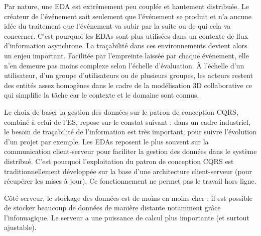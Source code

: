 Par nature, une \gls{EDA} est extrêmement peu couplée et 
hautement distribuée. Le créateur de l'événement sait seulement que l'événement 
se produit et n'a aucune idée du traitement que l'événement va subir par 
la suite ou de qui cela va concerner. 
C'est pourquoi les \glspl{EDA} sont plus utilisées dans un 
contexte de flux d'information asynchrone. La traçabilité dans ces environnements 
devient alors un enjeu important. Facilitée par l'empreinte laissée par chaque 
événement, elle n'en demeure pas moins complexe selon l'échelle d'évaluation. À 
l'échelle d'un utilisateur, d'un groupe d'utilisateurs ou de plusieurs groupes, les
acteurs restent des entités assez homogènes dans le cadre de la modélisation 
\gls{3D} collaborative ce qui simplifie la tâche car le contexte et le domaine sont
connus.



%

Le choix de baser la gestion des données sur le patron de conception \gls{CQRS}, 
combiné à celui de l'\gls{ES}, repose sur le constat suivant : dans un cadre industriel, le 
besoin de traçabilité de l'information est très important, pour suivre l'évolution d'un 
projet par exemple. 
Les \glspl{EDA} reposent le plus souvent sur 
la communication client-serveur pour faciliter la gestion des données dans le 
système distribué. C'est pourquoi l'exploitation du patron de conception 
\gls{CQRS} est traditionnellement développée sur la base d'une architecture client-serveur (pour récupérer les mises à jour). 
Ce fonctionnement ne permet pas le travail hors ligne.

Côté serveur, le stockage des données est de moins en moins cher : il est possible de 
stocker beaucoup de données de manière distante notamment 
grâce l'infonuagique. Le serveur a une puissance de calcul plus importante (et surtout ajustable).

